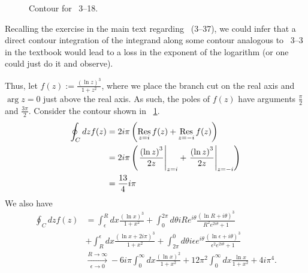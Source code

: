 \item

\begin{figure}[h]
	\centering
	\caption{Contour for ~3--18.}%
	\label{fig:problem3-18}
\end{figure}

Recalling the exercise in the main text regarding ~(3--37),
we could infer that a direct contour integration of the integrand along some contour analogous to ~3--3
in the textbook would lead to a loss in the exponent of the logarithm (or one could just do it and observe).

Thus, let $f(z) := \frac{{\left( \ln z \right)}^3}{1 + z^2}$,
where we place the branch cut on the real axis and $\arg z = 0$ just above the real axis.
As such, the poles of $f(z)$ have arguments $\frac{\pi}{2}$ and $\frac{3\pi}{2}$.
Consider the contour shown in ~\ref{fig:problem3-18}.
\begin{align*}
	\oint_C dz f(z)
	&= 2i\pi \left( \mathop{\mathrm{Res}}_{z=i} f(z) + \mathop{\mathrm{Res}}_{z=-i} f(z) \right) \\
	&= 2i\pi \left( {\left. \frac{{\left( \ln z \right)}^3}{2z} \right|}_{z=i} + {\left. \frac{{\left( \ln z \right)}^3}{2z} \right|}_{z=-i} \right) \\
	&= \frac{13}{4}i\pi
\end{align*}
We also have
\begin{align*}
    \oint_C dz f(z)
    &= \int_\epsilon^R dx \frac{{\left( \ln x \right)}^3}{1 +x^2}
     + \int_0^{2\pi} d\theta iRe^{i\theta} \frac{{\left( \ln R + i\theta\right)}^3}{R^2 e^{2i\theta} + 1} \\
    &+ \int_R^\epsilon dx \frac{{\left( \ln x + 2i\pi \right)}^3}{1 + x^2}
     + \int_{2\pi}^0 d\theta i\epsilon e^{i\theta} \frac{{\left(\ln\epsilon + i\theta\right)}^3}{\epsilon^2 e^{2i\theta} + 1} \\
    &\xrightarrow[\epsilon \rightarrow 0]{R \rightarrow \infty}
        -6i\pi \int_0^\infty dx \frac{{\left( \ln x \right)}^2}{1 + x^2}
	+ 12\pi^2 \int_0^\infty dx \frac{\ln x}{1 + x^2}
	+ 4i\pi^4.
\end{align*}

